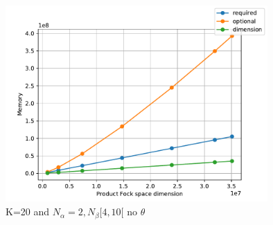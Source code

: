 \documentclass[12p]{article}
\begin{document}
\begin{center}
\begin{figure}
  \centering
  \includegraphics[width=10cm]{graphs/K=20_neq_dumb_low.pdf}
  \caption{K=20 and $N_\alpha = 2, N_\beta [4,10[$ no $\theta$}
  \label{}
\end{figure}

\end{center}
\end{document}
